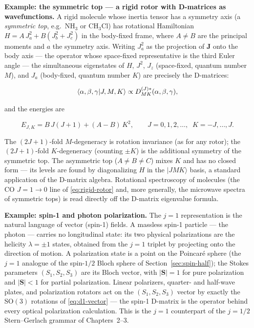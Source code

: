 \medskip\noindent\textbf{Example: the symmetric top --- a rigid rotor with D-matrices as wavefunctions.} A rigid molecule whose inertia tensor has a symmetry axis (a \emph{symmetric top}, e.g.\ NH$_{3}$ or CH$_{3}$Cl) has rotational Hamiltonian $H=A\,J_{a}^{2}+B(J_{b}^{2}+J_{c}^{2})$ in the body-fixed frame, where $A\ne B$ are the principal moments and $a$ the symmetry axis. Writing $J_{a}^{2}$ as the projection of $\bm J$ onto the body axis --- the operator whose space-fixed representative is the third Euler angle --- the simultaneous eigenstates of $H$, $J^{2}$, $J_{z}$ (space-fixed, quantum number $M$), and $J_{a}$ (body-fixed, quantum number $K$) are precisely the D-matrices:
\begin{linenomath}
    \begin{equation}
        \braket{\alpha,\beta,\gamma|J,M,K}\propto D^{(J)*}_{MK}(\alpha,\beta,\gamma),
        \label{eq:symmetric-top}
    \end{equation}
\end{linenomath}
and the energies are
\begin{linenomath}
    \begin{equation*}
        E_{J,K}=B\,J(J+1)+(A-B)\,K^{2},\qquad J=0,1,2,\ldots,\;\;K=-J,\ldots,J.
    \end{equation*}
\end{linenomath}
The $(2J+1)$-fold $M$-degeneracy is rotation invariance (as for any rotor); the $(2J+1)$-fold $K$-degeneracy (counting $\pm K$) is the additional symmetry of the symmetric top. The asymmetric top ($A\ne B\ne C$) mixes $K$ and has no closed form --- its levels are found by diagonalizing $H$ in the $|JMK\rangle$ basis, a standard application of the D-matrix algebra. Rotational spectroscopy of molecules (the CO $J=1\to0$ line of \eqref{eq:rigid-rotor} and, more generally, the microwave spectra of symmetric tops) is read directly off the D-matrix eigenvalue formula.

\medskip\noindent\textbf{Example: spin-1 and photon polarization.} The $j=1$ representation is the natural language of vector (spin-1) fields. A massless spin-1 particle --- the photon --- carries no longitudinal state: its two physical polarizations are the helicity $\lambda=\pm1$ states, obtained from the $j=1$ triplet by projecting onto the direction of motion. A polarization state is a point on the Poincar\'e sphere (the $j=1$ analogue of the spin-$1/2$ Bloch sphere of Section~\ref{sec:spin-half}); the Stokes parameters $(S_{1},S_{2},S_{3})$ are its Bloch vector, with $|\bm S|=1$ for pure polarization and $|\bm S|<1$ for partial polarization. Linear polarizers, quarter- and half-wave plates, and polarization rotators act on the $(S_{1},S_{2},S_{3})$ vector by exactly the $\mathrm{SO}(3)$ rotations of \eqref{eq:d1-vector} --- the spin-1 D-matrix is the operator behind every optical polarization calculation. This is the $j=1$ counterpart of the $j=1/2$ Stern--Gerlach grammar of Chapters~2--3.


